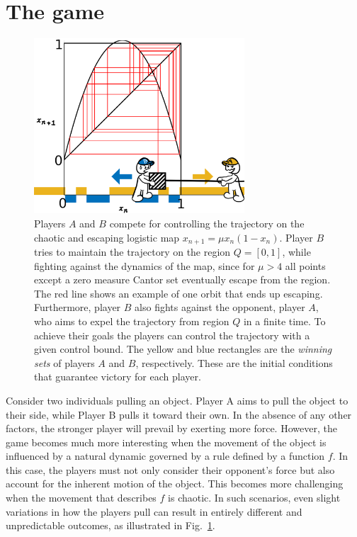 \section{The game}


\begin{figure}
    \centering
    \includegraphics[width=0.7\textwidth]{Images/P5/drawing.png}
    \caption{Players $A$ and $B$ compete for controlling the trajectory on the chaotic and escaping logistic map $x_{n+1} = \mu x_n(1-x_n)$. Player $B$ tries to maintain the trajectory on the region $Q = [0,1]$, while fighting against the dynamics of the map, since for $\mu > 4$ all points except a zero measure Cantor set eventually escape from the region. The red line shows an example of one orbit that ends up escaping. Furthermore, player $B$ also fights against the opponent, player $A$, who aims to expel the trajectory from region $Q$ in a finite time. To achieve their goals the players can control the trajectory with a given control bound. The yellow and blue rectangles are the \textit{winning sets} of players $A$ and $B$, respectively. These are the initial conditions that guarantee victory for each player.}
    \label{fig:drawing}
\end{figure}



Consider two individuals pulling an object. Player A aims to pull the object to their side, while Player B pulls it toward their own. In the absence of any other factors, the stronger player will prevail by exerting more force. However, the game becomes much more interesting when the movement of the object is influenced by a natural dynamic governed by a rule defined by a function $f$. In this case, the players must not only consider their opponent's force but also account for the inherent motion of the object. This becomes more challenging when the movement that describes $f$ is chaotic. In such scenarios, even slight variations in how the players pull can result in entirely different and unpredictable outcomes, as illustrated in Fig.~\ref{fig:drawing}.  



